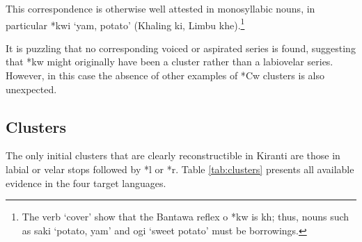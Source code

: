 \documentclass[oldfontcommands,oneside,a4paper,11pt]{article}
\newcommand{\ipa}[1]{{\phon\mbox{#1}}} %
\begin{document}
 This correspondence is otherwise well attested in monosyllabic nouns, in particular *\ipa{kwi} `yam, potato' (Khaling \ipa{ki}, Limbu \ipa{khe}).\footnote{The verb `cover' show that the Bantawa reflex o *\ipa{kw} is \ipa{kh}; thus, nouns such as \ipa{saki} `potato, yam' and \ipa{ogi} `sweet potato' must be borrowings.}

It is puzzling that no corresponding voiced or aspirated series is found, suggesting that *\ipa{kw} might originally have been a cluster rather than a labiovelar series. However, in this case the absence of other examples of *\ipa{Cw} clusters is also unexpected.

\subsection{Clusters} \label{sec:clusters}
The only initial clusters that are clearly reconstructible in Kiranti are those in labial or velar stops followed by *\ipa{l} or *\ipa{r}. Table \ref{tab:clusters} presents all available evidence in the four target languages.
\end{document}
